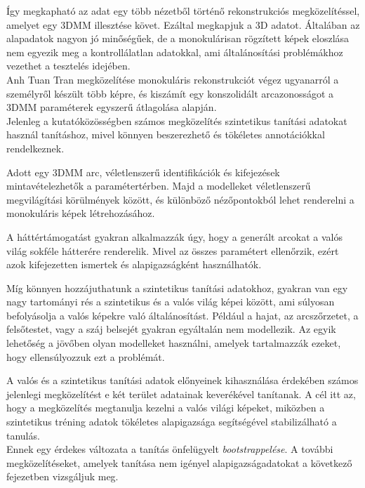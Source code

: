 \documentclass[12pt,a4]{article}
\begin{document}
	Így megkapható az adat egy több nézetből történő rekonstrukciós megközelítéssel, amelyet egy 3DMM illesztése követ. Ezáltal megkapjuk a 3D adatot. Általában az alapadatok nagyon jó minőségűek,
	de a monokulárisan rögzített képek eloszlása nem
	egyezik meg a kontrollálatlan adatokkal, ami általánosítási problémákhoz vezethet
	a tesztelés idejében.\\
	
	\cite{tran}Anh Tuan Tran megközelítése monokuláris rekonstrukciót végez ugyanarról a személyről készült több képre, és kiszámít egy konszolidált arcazonosságot a 3DMM paraméterek egyszerű átlagolása alapján. \\
	
	Jelenleg a kutatóközösségben számos megközelítés szintetikus tanítási adatokat használ tanításhoz, mivel könnyen beszerezhető és tökéletes annotációkkal rendelkeznek. 
	
	Adott egy 3DMM arc, véletlenszerű identifikációk és kifejezések mintavételezhetők a paramétertérben. 
	Majd a modelleket véletlenszerű megvilágítási körülmények között, és különböző nézőpontokból lehet renderelni a monokuláris képek létrehozásához. 
	
	A háttértámogatást gyakran alkalmazzák úgy, hogy a generált arcokat a valós világ sokféle hátterére renderelik. Mivel az összes paramétert ellenőrzik, ezért azok kifejezetten ismertek és alapigazságként használhatók.
	
	Míg könnyen hozzájuthatunk a szintetikus tanítási adatokhoz, gyakran van egy nagy tartományi rés
	a szintetikus és a valós világ képei között, ami súlyosan befolyásolja
	a valós képekre való általánosítást. Például a hajat, az arcszőrzetet, a felsőtestet,
	vagy a száj belsejét gyakran egyáltalán nem modellezik. Az egyik lehetőség
	a jövőben olyan modelleket használni, amelyek tartalmazzák ezeket, hogy ellensúlyozzuk ezt a problémát. 
	
	A valós és a szintetikus tanítási adatok előnyeinek kihasználása érdekében számos jelenlegi megközelítést e két terület adatainak keverékével tanítanak. A cél itt az, hogy a megközelítés megtanulja kezelni a valós világi képeket, miközben a szintetikus tréning adatok tökéletes alapigazsága
	segítségével stabilizálható a tanulás.\\

	Ennek egy érdekes változata
	a tanítás önfelügyelt \textit{bootstrappelése}. A további megközelítéseket, amelyek tanítása nem igényel
	alapigazságadatokat a következő fejezetben vizsgáljuk meg.
	
\end{document}
